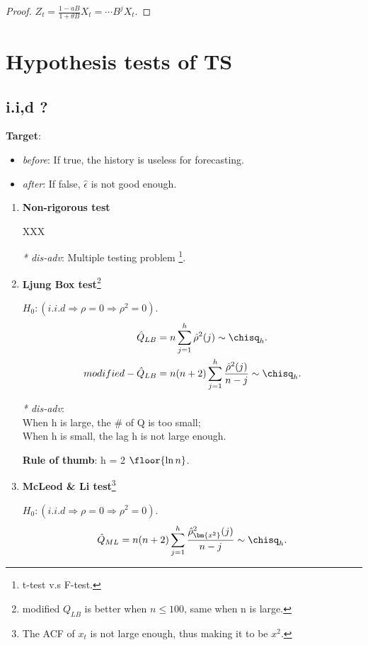 \begin{proof}
$Z_t = \frac{1- a B}{1+\theta B} X_t = \cdots B^j X_t$.
\end{proof}

\section{Hypothesis tests of TS}

\subsection{i.i,d ?}

\textbf{Target}:
\begin{itemize}
    \item \textit{before}: If true, the history is useless for forecasting.
    \item \textit{after}: If false, $\hat{\epsilon}$ is not good enough.
\end{itemize}

\begin{enumerate}
    \item \textbf{Non-rigorous test}
    
    XXX
    
    \textit{* dis-adv}: Multiple testing problem 
    \footnote{t-test v.s F-test.}.
    
    \item \textbf{Ljung Box test}\footnote{modified $Q_{LB}$ is better when $n \leq 100$, same when n is large.}
    
    $H_0 : (i.i.d \Rightarrow \rho = 0 \Rightarrow \rho^2 = 0)$.
    \begin{align*}
        \hat{Q}_{LB} &= n \sum_{j=1}^{h} \hat{\rho}^2(j) \sim \chisq_h.\\
        modified-\hat{Q}_{LB} &= n(n+2) \sum_{j=1}^{h} \frac{\hat{\rho}^2(j)}{n-j} \sim \chisq_h.
    \end{align*}
    
    
    \textit{* dis-adv}: \\
    When h is large, the \# of Q is too small; \\
    When h is small, the lag h is not large enough.
    
    \textbf{Rule of thumb}: h = 2 $\floor{\ln{n}}$.
    
    \item \textbf{McLeod \& Li test}\footnote{The ACF of $x_t$ is not large enough, thus making it to be $x^2$.}
    
    $H_0 : (i.i.d \Rightarrow \rho = 0 \Rightarrow \rho^2 = 0)$.
    \begin{align*}
        \hat{Q}_{ML} = n(n+2) \sum_{j=1}^{h} \frac{\hat{\rho}_{\bm{x^2}}^2(j)}{n-j} \sim \chisq_h.
    \end{align*}
\end{enumerate}

